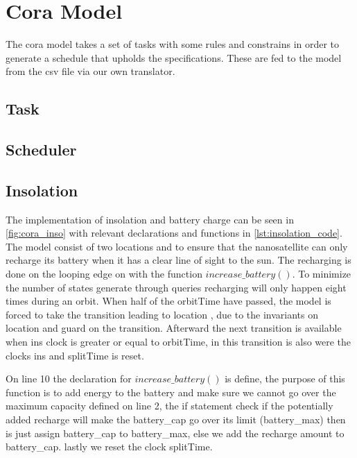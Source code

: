 \section{Cora Model} \label{sec:cora}
The \gls{cora} model takes a set of tasks with some rules and constrains in order to generate a schedule that upholds the specifications. These are fed to the model from the csv file via our own translator.


\subsection*{Task}
\subsection*{Scheduler}
\subsection*{Insolation}
The implementation of insolation and battery charge can be seen in \cref{fig:cora_inso} with relevant declarations and functions in \cref{lst:insolation_code}. The model consist of two locations  and  to ensure that the nanosatellite can only recharge its battery when it has a clear line of sight to the sun. The recharging is done on the looping edge on  with the function $increase\_battery()$. To minimize the number of states generate through queries recharging will only happen eight times during an orbit. When half of the orbitTime have passed, the model is forced to take the transition leading to location , due to the invariants on  location and guard on the transition. Afterward the next transition is available when ins clock is greater or equal to orbitTime, in this transition is also were the clocks ins and splitTime is reset.

On line 10 the declaration for $increase\_battery()$ is define, the purpose of this function is to add energy to the battery and make sure we cannot go over the maximum capacity defined on line 2, the if statement check if the potentially added recharge will make the battery_cap go over its limit (battery\_max) then is just assign battery_cap to battery\_max, else we add the recharge amount to battery\_cap. lastly we reset the clock splitTime.

